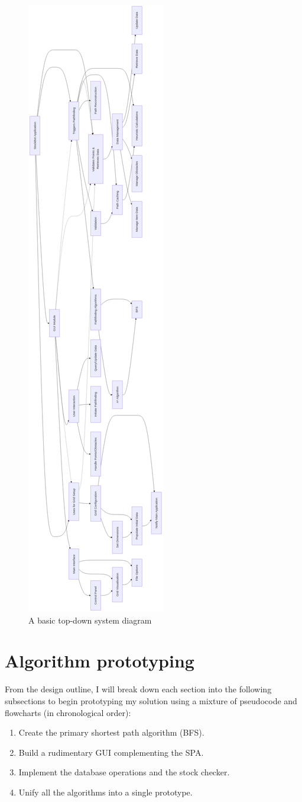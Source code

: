 \begin{figure}[!htbp]
	\centering
	\includegraphics[width=0.3\linewidth]{Images/top-down-diagram.png}
	\caption{A basic top-down system diagram}
\end{figure}


\newpage
\section{Algorithm prototyping}

From the design outline, I will break down each section into the following subsections to begin prototyping my solution using a mixture of pseudocode and flowcharts (in chronological order):

\begin{enumerate}
    \item Create the primary shortest path algorithm (BFS).
    \item Build a rudimentary GUI complementing the SPA.
    \item Implement the database operations and the stock checker.
    \item Unify all the algorithms into a single prototype.
\end{enumerate}


